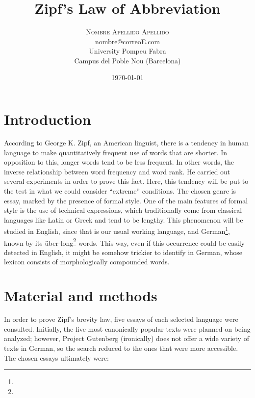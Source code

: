 \documentclass[a4paper]{article}
\title{Zipf’s Law of Abbreviation}
\author{
	\textsc{Nombre Apellido Apellido}\\[1ex]
	\normalsize{nombre@correoE.com}\\[1ex]
	\normalsize University Pompeu Fabra\\
	\normalsize Campus del Poble Nou (Barcelona)
	}
\date{\today}
\begin{document}
\pagestyle{empty} %
\maketitle
\thispagestyle{empty} %


\section{Introduction}

According to George K. Zipf, an American linguist, there is a tendency in human
language to make quantitatively frequent use of words that are shorter. In
opposition to this, longer words tend to be less frequent. In other words, the
inverse relationship between word frequency and word rank. He carried out
several experiments in order to prove this fact. Here, this tendency will be
put to the test in what we could consider ``extreme'' conditions. The chosen
genre is essay, marked by the presence of formal style. One of the main
features of formal style is the use of technical expressions, which
traditionally come from classical languages like Latin or Greek and tend to be
lengthy. This phenomenon will be studied in English, since that is our usual
working language, and German\footnote{}, known by its
über-long\footnote{} words. This way,
even if this occurrence could be easily detected in English, it might be
somehow trickier to identify in German, whose lexicon consists of
morphologically compounded words.

\section{Material and methods}

In order to prove Zipf’s brevity law, five essays of each selected language
were consulted. Initially, the five most canonically popular texts were planned
on being analyzed; however, Project Gutenberg (ironically) does not offer a
wide variety of texts in German, so the search reduced to the ones that were
more accessible. The chosen essays ultimately were:
\end{document}

